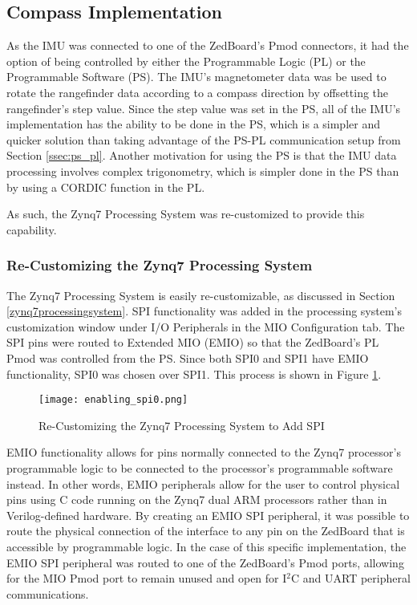 \subsection{Compass Implementation}
As the IMU was connected to one of the ZedBoard's Pmod connectors, it had the option of being controlled by either the Programmable Logic (PL) or the Programmable Software (PS). The IMU's magnetometer data was be used to rotate the rangefinder data according to a compass direction by offsetting the rangefinder's step value. Since the step value was set in the PS, all of the IMU's implementation has the ability to be done in the PS, which is a simpler and quicker solution than taking advantage of the PS-PL communication setup from Section \ref{ssec:ps_pl}. Another motivation for using the PS is that the IMU data processing involves complex trigonometry, which is simpler done in the PS than by using a CORDIC function in the PL.
\par
As such, the Zynq7 Processing System was re-customized to provide this capability.

\subsubsection{Re-Customizing the Zynq7 Processing System}
The Zynq7 Processing System is easily re-customizable, as discussed in Section \ref{zynq7processingsystem}. SPI functionality was added in the processing system's customization window under I/O Peripherals in the MIO Configuration tab. The SPI pins were routed to Extended MIO (EMIO) so that the ZedBoard's PL Pmod was controlled from the PS. Since both SPI0 and SPI1 have EMIO functionality, SPI0 was chosen over SPI1. This process is shown in Figure \ref{enabling_spi0}.

\begin{figure}[H]
	\centerline{\texttt{[image: enabling\_spi0.png]}}
	\caption{Re-Customizing the Zynq7 Processing System to Add SPI}
	\label{enabling_spi0}
\end{figure}

\par
EMIO functionality allows for pins normally connected to the Zynq7 processor's programmable logic to be connected to the processor's programmable software instead. In other words, EMIO peripherals allow for the user to control physical pins using C code running on the Zynq7 dual ARM processors rather than in Verilog-defined hardware. By creating an EMIO SPI peripheral, it was possible to route the physical connection of the interface to any pin on the ZedBoard that is accessible by programmable logic. In the case of this specific implementation, the EMIO SPI peripheral was routed to one of the ZedBoard's Pmod ports, allowing for the MIO Pmod port to remain unused and open for I$^2$C and UART peripheral communications.






